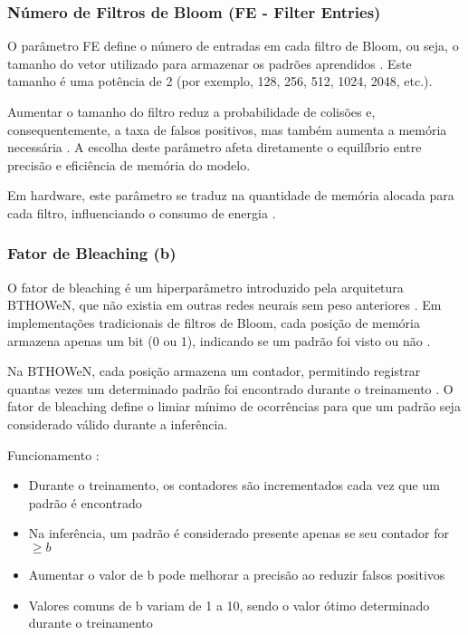 \documentclass{article}
\begin{document}
\subsubsection{Número de Filtros de Bloom (FE - Filter Entries)}

O parâmetro FE define o número de entradas em cada filtro de Bloom, ou seja, o tamanho do vetor utilizado para armazenar os padrões aprendidos \cite{santiago2020}. Este tamanho é uma potência de 2 (por exemplo, 128, 256, 512, 1024, 2048, etc.).

Aumentar o tamanho do filtro reduz a probabilidade de colisões e, consequentemente, a taxa de falsos positivos, mas também aumenta a memória necessária \cite{santiago2020, susskind2022}. A escolha deste parâmetro afeta diretamente o equilíbrio entre precisão e eficiência de memória do modelo.

Em hardware, este parâmetro se traduz na quantidade de memória alocada para cada filtro, influenciando o consumo de energia \cite{susskind2022}.

\subsubsection{Fator de Bleaching (b)}

O fator de bleaching é um hiperparâmetro introduzido pela arquitetura BTHOWeN, que não existia em outras redes neurais sem peso anteriores \cite{santiago2020}. Em implementações tradicionais de filtros de Bloom, cada posição de memória armazena apenas um bit (0 ou 1), indicando se um padrão foi visto ou não \cite{santiago2020, lusquino2020}. 

Na BTHOWeN, cada posição armazena um contador, permitindo registrar quantas vezes um determinado padrão foi encontrado durante o treinamento \cite{santiago2020}. O fator de bleaching define o limiar mínimo de ocorrências para que um padrão seja considerado válido durante a inferência.

Funcionamento \cite{santiago2020, susskind2022}:
\begin{itemize}
    \item Durante o treinamento, os contadores são incrementados cada vez que um padrão é encontrado
    \item Na inferência, um padrão é considerado presente apenas se seu contador for $\geq b$
    \item Aumentar o valor de b pode melhorar a precisão ao reduzir falsos positivos
    \item Valores comuns de b variam de 1 a 10, sendo o valor ótimo determinado durante o treinamento
\end{itemize}
\end{document}
